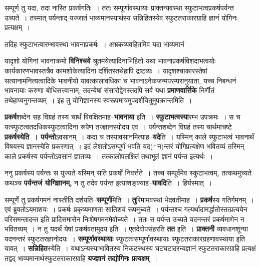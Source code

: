 \documentclass[article,12pt,a4paper]{memoir}
\newcommand{\add}[1]{($^{+}$#1)}
\begin{document}
	  \pstart सम्पूर्ण तु यदा, तदा नास्ति प्रकर्षगतिः । ततः सम्पूर्णावस्थायाः प्राक्तन्यवस्था स्फुटाभत्वप्रकर्षपर्यन्त उच्यते । तस्मात् पर्यन्ताद् यज्जातं भाव्यमानस्यार्थस्य सन्निहितस्येव स्फुटतराकारग्राहि ज्ञानं योगिनः प्रत्यक्षम् ।
	\pend
        

	  \pstart तदिह स्फुटाभत्वारम्भावस्था भावनाप्रकर्षः । अभ्रकव्यवहितमिव यदा भाव्यमानं
	\pend
      
	  \endgroup
	

	  \pstart यादृशो योगिनां भावनाक्रमो \textbf{विनिश्चये} श्रुतमयेत्यादिनाभिहितो यथा भावनाप्रकर्षविशदाभत्वयोः कार्यकारणभावस्तत्रैव कामशोकेत्यादिना दर्शितस्तथेहापि द्रष्टव्यः । यादृशश्चाकारस्तेषां सत्यानामनित्यत्वादिके भावनीयो यावत्कालावधिका च भावनाऽनेकजन्मपरम्परानुयाता, यच्च निबन्धनं भावनायाः करुणा बोधिसत्त्वानाम्, तदन्येषां संसारोद्वेगस्तदपि सर्व यथा \textbf{प्रमाणवार्त्तिके} निर्णीतं तथेहाप्यनुगन्तव्यम् । इह तु योगिज्ञानस्य स्वरूपमात्रमुपदर्शयितुमुपक्रान्तमिति ।
	\pend
      

	  \pstart \textbf{प्रकर्ष}शब्देन सह विग्रहं तस्य चार्थं विवक्षितमाह--\textbf{भावनाया} इति । \textbf{स्फुटाभत्वस्या}रम्भ उपक्रमः । स च यत्स्फुटत्वतदधिकस्फुटत्वादिना रूपेण तज्ज्ञानस्योदय एव । पर्यन्तशब्देन विग्रहं तस्य चार्थमाचष्टे \textbf{प्रकर्षस्येति । पर्यन्तो}ऽवसानम् । कदा च तस्यावसानमित्याह--\textbf{यदे}ति । यस्मिन् काले स्फुटाभत्वं भावनार्थं विषयस्य ज्ञानस्येति प्रकरणात् । इदं लेशतोऽसम्पूर्णं भवति यद\add{न}न्तरं योगिप्रत्यक्षेण भवितव्यं तस्मिन् काले प्रकर्षस्य पर्यन्तोऽवसानं ज्ञातव्यः । तत्कालोपलक्षितं तथाभूतं ज्ञानं पर्यन्त इत्यर्थः ।
	\pend
      

	  \pstart ननु प्रकर्षस्य पर्यन्तः स युज्यते यस्मिन् सति प्रकर्षो निवर्त्तते । तच्च सम्पूर्वंमेव स्कुटाभत्वम्, तत्कथमुच्यते कथञ्च \textbf{पर्यन्तजं योगिज्ञानम्,} न तु तदेव पर्यन्त इत्याशङ्क्याह--\textbf{यावदि}ति । हिर्यस्मात् ।
	\pend
      

	  \pstart सम्पूर्णे तु प्रकर्षगमनं नास्तीति दर्शयति--\textbf{सम्पूर्ण}मिति । \textbf{तु}रिमामवस्थां भेदवतीमाह । \textbf{प्रकर्ष}स्य गतिर्गमनम् । एवं ब्रुवतोऽयमाशयः । प्रकर्षः प्रकृष्यमाणता सातिशयं रूपमुच्यते । पर्यन्तश्च गत्यर्थादामर्द्धातोस्तत्प्रत्ययेन  परिसमन्तादन्त इति प्रादिसमासेन निःशेषगमनमेवोच्यते । ततः स पर्यन्त उच्यते यदनन्तरं प्रकर्षमाणेन न भवितव्यम् । न तु यदर्थं येषां प्रकर्षवतामुदय इति । एतदेवोपसंहरति \textbf{तत} इति । \textbf{प्राक्तनी} व्यवधानशून्या यदनन्तरं स्फुटतरज्ञानोदयः । \textbf{सम्पूर्णावस्थायाः} स्फुटत्वसम्पूर्णावस्थायाः स्फुटतराकारग्रहणावस्थाया इति यावत् । \textbf{सन्निहित}स्येति । यथाऽन्यस्याभावितस्य निकटस्थस्य घटघटादरन्यज्ञानं स्फुटतराकारग्राहि प्रत्यक्षं तद्वद् भाव्यमानार्थस्फुटतराकारग्राहि \textbf{यज्ज्ञानं तद्योगिनः प्रत्यक्षम्} ।
	\pend
      
\end{document}
